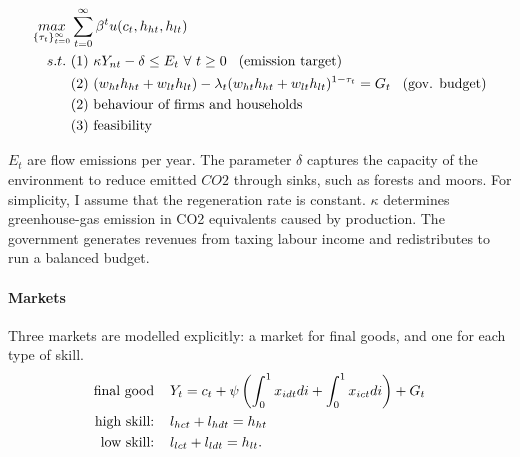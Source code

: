 \begin{align*}
\underset{\{\tau_{t}\}_{t=0}^{\infty}}{max}&\sum_{t=0}^{\infty}\beta^t u(c_{t}, h_{ht}, h_{lt})\\
s.t.\ %
& (1)\ \kappa Y_{nt} -\delta \leq E_t \  \forall \ t\geq 0\hspace{3mm} \text{(emission target)}\\
& (2)\ (w_{ht}h_{ht}+w_{lt}h_{lt})-\lambda_t (w_{ht}h_{ht}+w_{lt}h_{lt})^{1-\tau_{t}} = G_t\hspace{3mm} \text{(gov. budget)}\\
& (2)\ \text{behaviour of firms and households}\\
& (3)\ \text{feasibility}
\end{align*}

$E_t$ are flow emissions per year.  The parameter $\delta$ captures the capacity of the environment to reduce emitted $CO2$ through sinks, such as forests and moors.  For simplicity, I assume that the regeneration rate is constant. $\kappa$ determines greenhouse-gas emission in CO2 equivalents caused by production. %
The government generates revenues from taxing labour income and redistributes to run a balanced budget. 


\paragraph{Markets}
Three markets are modelled explicitly: a market for final goods, and one for each type of skill.
\begin{align*}
\text{final good}\hspace{4mm}& Y_{t}=c_t+\psi\left(\int_{0}^1x_{idt}di+\int_{0}^1x_{ict}di\right)+ G_t\\
\text{high skill:}\hspace{4mm}& l_{hct}+l_{hdt}=h_{ht}\\
\text{low skill:}\hspace{4mm}&l_{lct}+l_{ldt}=h_{lt}.
\end{align*}





